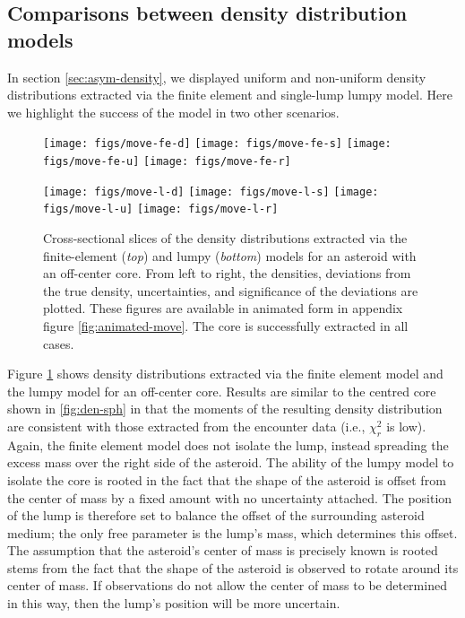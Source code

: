 \documentclass[fleqn,usenatbib]{mnras}
\begin{document}
\subsection{Comparisons between density distribution models}
\label{sec:density-compare}

In section \ref{sec:asym-density}, we displayed uniform and non-uniform density distributions extracted via the finite element and single-lump lumpy model. Here we highlight the success of the model in two other scenarios.

\begin{figure}
  \texttt{[image: figs/move-fe-d]}\hfill
  \texttt{[image: figs/move-fe-s]}\hfill
  \texttt{[image: figs/move-fe-u]}\hfill
  \texttt{[image: figs/move-fe-r]}

  \texttt{[image: figs/move-l-d]}\hfill
  \texttt{[image: figs/move-l-s]}\hfill
  \texttt{[image: figs/move-l-u]}\hfill
  \texttt{[image: figs/move-l-r]}

  \caption{Cross-sectional slices of the density distributions extracted via the finite-element (\textit{top}) and lumpy (\textit{bottom}) models for an asteroid with an off-center core. From left to right, the densities, deviations from the true density, uncertainties, and significance of the deviations are plotted. These figures are available in animated form in appendix figure \ref{fig:animated-move}. The core is successfully extracted in all cases.}
  \label{fig:den-move}
\end{figure}

Figure \ref{fig:den-move} shows density distributions extracted via the finite element model and the lumpy model for an off-center core. Results are similar to the centred core shown in \ref{fig:den-sph} in that the moments of the resulting density distribution are consistent with those extracted from the encounter data (i.e., $\chi^2_r$ is low). Again, the finite element model does not isolate the lump, instead spreading the excess mass over the right side of the asteroid. The ability of the lumpy model to isolate the core is rooted in the fact that the shape of the asteroid is offset from the center of mass by a fixed amount with no uncertainty attached. The position of the lump is therefore set to balance the offset of the surrounding asteroid medium; the only free parameter is the lump's mass, which determines this offset. The assumption that the asteroid's center of mass is precisely known is rooted stems from the fact that the shape of the asteroid is observed to rotate around its center of mass. If observations do not allow the center of mass to be determined in this way, then the lump's position will be more uncertain.
\end{document}
